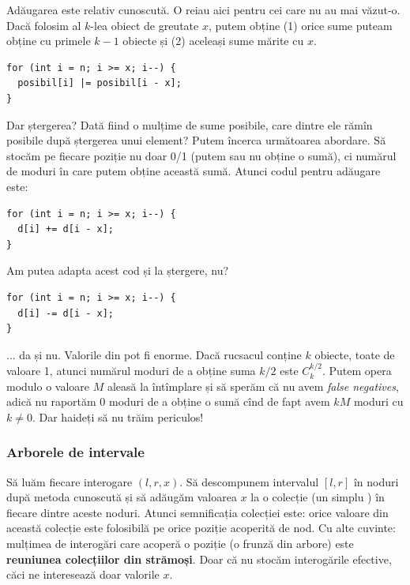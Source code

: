 Adăugarea este relativ cunoscută. O reiau aici pentru cei care nu au mai văzut-o. Dacă folosim al $k$-lea obiect de greutate $x$, putem obține (1) orice sume puteam obține cu primele $k-1$ obiecte și (2) aceleași sume mărite cu $x$.

\begin{verbatim}
for (int i = n; i >= x; i--) {
  posibil[i] |= posibil[i - x];
}
\end{verbatim}

Dar ștergerea? Dată fiind o mulțime de sume posibile, care dintre ele rămîn posibile după ștergerea unui element? Putem încerca următoarea abordare. Să stocăm pe fiecare poziție nu doar 0/1 (putem sau nu obține o sumă), ci numărul de moduri în care putem obține această sumă. Atunci codul pentru adăugare este:

\begin{verbatim}
for (int i = n; i >= x; i--) {
  d[i] += d[i - x];
}
\end{verbatim}

Am putea adapta acest cod și la ștergere, nu?

\begin{verbatim}
for (int i = n; i >= x; i--) {
  d[i] -= d[i - x];
}
\end{verbatim}

... da și nu. Valorile din  pot fi enorme. Dacă rucsacul conține $k$ obiecte, toate de valoare 1, atunci numărul moduri de a obține suma $k/2$ este $C_{k}^{k/2}$. Putem opera modulo o valoare $M$ aleasă la întîmplare și să sperăm că nu avem \textit{false negatives}, adică nu raportăm 0 moduri de a obține o sumă cînd de fapt avem $kM$ moduri cu $k \neq 0$. Dar haideți să nu trăim periculos!

\subsubsection*{Arborele de intervale}

Să luăm fiecare interogare $(l, r, x)$. Să descompunem intervalul $[l,r]$ în noduri după metoda cunoscută și să adăugăm valoarea $x$ la o colecție (un simplu ) în fiecare dintre aceste noduri. Atunci semnificația colecției este: orice valoare din această colecție este folosibilă pe orice poziție acoperită de nod. Cu alte cuvinte: mulțimea de interogări care acoperă o poziție (o frunză din arbore) este \textbf{reuniunea colecțiilor din strămoși}. Doar că nu stocăm interogările efective, căci ne interesează doar valorile $x$.

